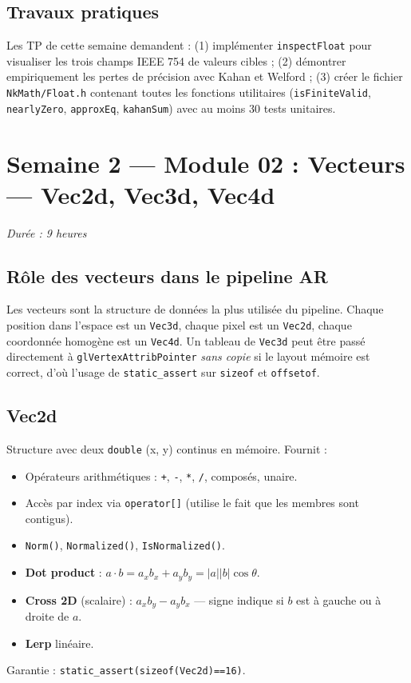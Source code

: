 \documentclass[11pt,a4paper]{article}
\begin{document}
\subsection{Travaux pratiques}
Les TP de cette semaine demandent : (1) implémenter \texttt{inspectFloat} pour visualiser les trois
champs IEEE 754 de valeurs cibles ; (2) démontrer empiriquement les pertes de précision avec
Kahan et Welford ; (3) créer le fichier \texttt{NkMath/Float.h} contenant toutes les fonctions
utilitaires (\texttt{isFiniteValid}, \texttt{nearlyZero}, \texttt{approxEq}, \texttt{kahanSum}) avec
au moins 30 tests unitaires.

\section{Semaine 2 — Module 02 : Vecteurs — Vec2d, Vec3d, Vec4d}
\textit{Durée : 9 heures}

\subsection{Rôle des vecteurs dans le pipeline AR}
Les vecteurs sont la structure de données la plus utilisée du pipeline. Chaque position dans
l'espace est un \texttt{Vec3d}, chaque pixel est un \texttt{Vec2d}, chaque coordonnée homogène
est un \texttt{Vec4d}. Un tableau de \texttt{Vec3d} peut être passé directement à
\texttt{glVertexAttribPointer} \textit{sans copie} si le layout mémoire est correct, d'où l'usage
de \texttt{static\_assert} sur \texttt{sizeof} et \texttt{offsetof}.

\subsection{Vec2d}
Structure avec deux \texttt{double} (x, y) continus en mémoire. Fournit :
\begin{itemize}[noitemsep]
  \item Opérateurs arithmétiques : \texttt{+}, \texttt{-}, \texttt{*}, \texttt{/}, composés, unaire.
  \item Accès par index via \texttt{operator[]} (utilise le fait que les membres sont contigus).
  \item \texttt{Norm()}, \texttt{Normalized()}, \texttt{IsNormalized()}.
  \item \textbf{Dot product} : $a \cdot b = a_x b_x + a_y b_y = |a||b|\cos\theta$.
  \item \textbf{Cross 2D} (scalaire) : $a_x b_y - a_y b_x$ — signe indique si $b$ est à gauche
        ou à droite de $a$.
  \item \textbf{Lerp} linéaire.
\end{itemize}
Garantie : \texttt{static\_assert(sizeof(Vec2d)==16)}.
\end{document}
